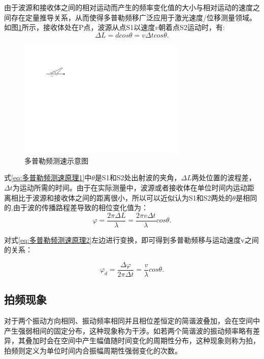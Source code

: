 由于波源和接收体之间的相对运动而产生的频率变化值的大小与相对运动的速度之间存在定量推导关系，从而使得多普勒频移广泛应用于激光速度/位移测量领域。如图\ref{fig:多普勒频测速示意图}所示，接收体处在P点，波源从点S1以速度\(v\)朝着点S2运动时，有:
\begin{equation}\label{eq:多普勒频测速原理1}
    \Delta L=dcos\theta=v\Delta tcos\theta.
\end{equation}
\begin{figure}[htb]
    \centering
    \includegraphics[width=8cm]{fig/2-fig/多普勒频测速示意图.drawio.pdf}
    \caption{多普勒频测速示意图}
    \label{fig:多普勒频测速示意图}
  \end{figure}

式\eqref{eq:多普勒频测速原理1}中\(\theta\)是S1和S2处出射波的夹角，\(\Delta L\)两处位置的波程差，\(\Delta t\)为运动所需的时间。由于在实际测量中，波源或者接收体在单位时间内运动距离相比于波源和接收体之间的距离很小，所以可以近似认为S1和S2两处的\(\theta\)是相同的\cite{百度百科-多普勒频移},由于波的传播路程差导致的相位变化值为：
\begin{equation}\label{eq:多普勒频测速原理2}
    \varphi=\frac{2\pi \Delta L}{\lambda}=\frac{2\pi v\Delta t}{\lambda}cos\theta.
\end{equation}


对式\eqref{eq:多普勒频测速原理2}左边进行变换，即可得到多普勒频移与运动速度v之间的关系：

\begin{equation}\label{eq:多普勒频测速原理3}
    \varphi_d=\frac{\Delta \varphi}{2\pi \Delta t}=\frac{v}{\lambda}cos\theta.
\end{equation}



\subsection{拍频现象}
对于两个振动方向相同、振动频率相同并且相位差恒定的简谐波叠加，会在空间中产生强弱相间的固定分布，这种现象称为干涉。如若两个简谐波的振动频率略有差异，其叠加时会在空间中产生幅值随时间变化的周期性分布，这种现象则称为拍\cite{基于拍频测量温度和旋光角的方法研究}，拍频则定义为单位时间内合振幅周期性强弱变化的次数。

